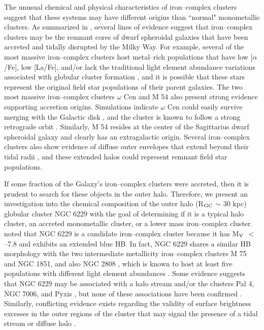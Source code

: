 \documentclass[12pt,preprint]{emulateapj}
\begin{document}
The unusual chemical and physical characteristics of iron--complex clusters 
suggest that these systems may have different origins than ``normal" 
monometallic clusters.  As summarized in \citet{DaCosta16}, several lines of 
evidence suggest that iron--complex clusters may be the remnant cores
of dwarf spheroidal galaxies that have been accreted and tidally
disrupted by the Milky Way.  For example, several of the most massive 
iron--complex clusters host metal--rich populations that have low 
[$\alpha$/Fe], low [La/Fe], and/or lack the traditional light element abundance
variations associated with globular cluster formation \citep{Carretta10a,
Johnson10,Marino11a,Pancino11,Yong14,Johnson15,Marino15,Johnson17a}, and 
it is possible that these stars represent the original field star populations 
of their parent galaxies.  The two most massive iron--complex clusters 
$\omega$ Cen and M 54 also present strong evidence supporting accretion 
origins.  Simulations indicate $\omega$ Cen could easily survive merging with 
the Galactic disk \citep[e.g.,][]{Bekki03}, and the cluster is known to 
follow a strong retrograde orbit \citep{Dinescu99}.  Similarly, M 54 
resides at the center of the Sagittarius dwarf spheroidal galaxy 
\citep[e.g.,][]{Bellazzini08} and clearly has an extragalactic origin.  Several 
iron--complex clusters also show evidence of diffuse outer envelopes that 
extend beyond their tidal radii \citep{Grillmair95,Olszewski09,Marino14,
Kuzma16}, and these extended halos could represent remnant field 
star populations.

If some fraction of the Galaxy's iron--complex clusters were accreted, then it
is prudent to search for these objects in the outer halo.  Therefore, we 
present an investigation into the chemical composition of the outer halo
(R$_{\rm GC}$ $\sim$ 30 kpc) globular cluster NGC 6229 with the goal of
determining if it is a typical halo cluster, an accreted monometallic cluster,
or a lower mass iron--complex cluster.  \citet{DaCosta16} noted that NGC 6229
is a candidate iron--complex cluster because it has M$_{\rm V}$ $<$ --7.8 and 
exhibits an extended blue HB.  In fact, NGC 6229 shares a similar HB morphology
with the two intermediate metallicity iron--complex clusters M 75 and NGC 1851,
and also NGC 2808 \citep{Borissova97,Borissova99,Catelan98,Catelan02}, which
is known to host at least five populations with different light
element abundances \citep[e.g.,][]{Carretta15,Milone15}.  Some evidence 
suggests that NGC 6229 may be associated with a halo stream and/or the clusters
Pal 4, NGC 7006, and Pyxis \citep{Palma02}, but none of these associations 
have been confirmed \citep[e.g.,][]{Grillmair14}.  Similarly, conflicting 
evidence exists regarding the validity of surface brightness excesses in the 
outer regions of the cluster that may signal the presence of a tidal stream or 
diffuse halo \citep{Sanna12,Carballo14,Bellazzini15}.
\end{document}
